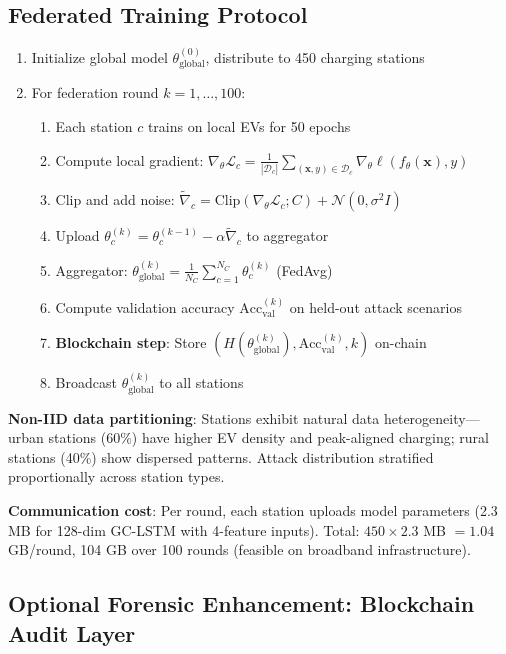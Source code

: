 \documentclass[journal]{IEEEtran}
\begin{document}
\subsection{Federated Training Protocol}
\label{sec:federated}

\begin{enumerate}
    \item Initialize global model $\theta_{\text{global}}^{(0)}$, distribute to 450 charging stations
    \item For federation round $k = 1, \ldots, 100$:
    \begin{enumerate}
        \item Each station $c$ trains on local EVs for 50 epochs
        \item Compute local gradient: $\nabla_\theta \mathcal{L}_c = \frac{1}{|\mathcal{D}_c|} \sum_{(\mathbf{x},y) \in \mathcal{D}_c} \nabla_\theta \ell(f_\theta(\mathbf{x}), y)$
        \item Clip and add noise: $\tilde{\nabla}_c = \text{Clip}(\nabla_\theta \mathcal{L}_c; C) + \mathcal{N}(0, \sigma^2 I)$
        \item Upload $\theta_c^{(k)} = \theta_c^{(k-1)} - \alpha \tilde{\nabla}_c$ to aggregator
        \item Aggregator: $\theta_{\text{global}}^{(k)} = \frac{1}{N_C} \sum_{c=1}^{N_C} \theta_c^{(k)}$ (FedAvg)
        \item Compute validation accuracy $\text{Acc}_{\text{val}}^{(k)}$ on held-out attack scenarios
        \item \textbf{Blockchain step}: Store $(H(\theta_{\text{global}}^{(k)}), \text{Acc}_{\text{val}}^{(k)}, k)$ on-chain
        \item Broadcast $\theta_{\text{global}}^{(k)}$ to all stations
    \end{enumerate}
\end{enumerate}

\textbf{Non-IID data partitioning}: Stations exhibit natural data heterogeneity—urban stations (60\%) have higher EV density and peak-aligned charging; rural stations (40\%) show dispersed patterns. Attack distribution stratified proportionally across station types.

\textbf{Communication cost}: Per round, each station uploads model parameters (2.3 MB for 128-dim GC-LSTM with 4-feature inputs). Total: $450 \times 2.3$ MB $= 1.04$ GB/round, 104 GB over 100 rounds (feasible on broadband infrastructure).

\subsection{Optional Forensic Enhancement: Blockchain Audit Layer}
\label{sec:blockchain}
\end{document}
